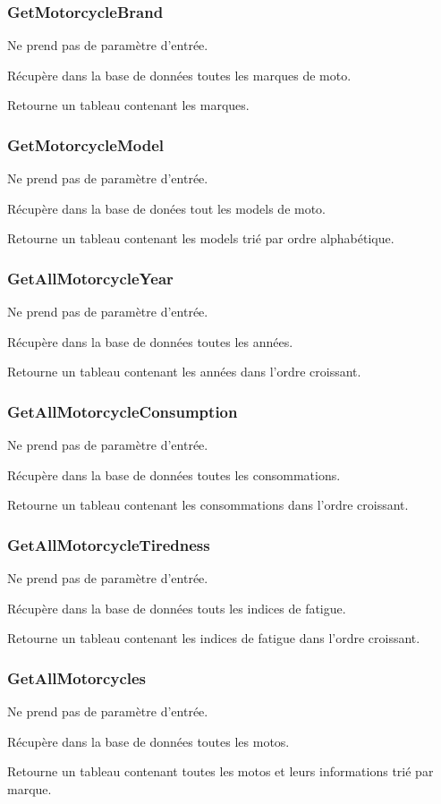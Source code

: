 \documentclass[a4paper]{article}
\begin{document}
\subsubsection{GetMotorcycleBrand}
Ne prend pas de paramètre d'entrée.

Récupère dans la base de données toutes les marques de moto.

Retourne un tableau contenant les marques.
\subsubsection{GetMotorcycleModel}
Ne prend pas de paramètre d'entrée.

Récupère dans la base de donées tout les models de moto.

Retourne un tableau contenant les models trié par ordre alphabétique.
\subsubsection{GetAllMotorcycleYear}
Ne prend pas de paramètre d'entrée.

Récupère dans la base de données toutes les années.

Retourne un tableau contenant les années dans l'ordre croissant.
\subsubsection{GetAllMotorcycleConsumption}
Ne prend pas de paramètre d'entrée.

Récupère dans la base de données toutes les consommations.

Retourne un tableau contenant les consommations dans l'ordre croissant.
\subsubsection{GetAllMotorcycleTiredness}
Ne prend pas de paramètre d'entrée.

Récupère dans la base de données touts les indices de fatigue.

Retourne un tableau contenant les indices de fatigue dans l'ordre croissant.
\subsubsection{GetAllMotorcycles}
Ne prend pas de paramètre d'entrée.

Récupère dans la base de données toutes les motos.

Retourne un tableau contenant toutes les motos et leurs informations trié par marque. 
\end{document}

